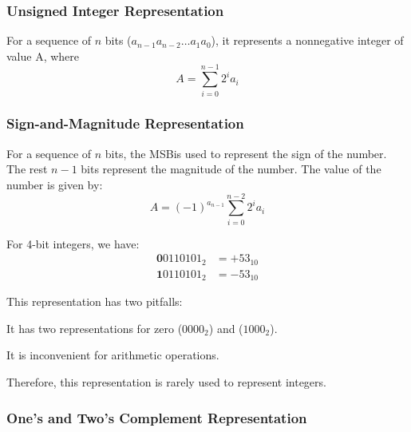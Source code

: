 \subsubsection{Unsigned Integer Representation}

\begin{definition}
    For a sequence of $n$ bits ($a_{n-1}a_{n-2}\ldots a_1a_0$), it represents a nonnegative integer
    of value A, where
    \begin{equation*}
        A = \sum_{i=0}^{n-1} 2^i a_i
    \end{equation*}
\end{definition}

\subsubsection{Sign-and-Magnitude Representation}

\begin{definition}
    For a sequence of $n$ bits, the MSB\footnotemark is used
    to represent the sign of the number. The rest $n-1$ bits represent the magnitude of the number.
    The value of the number is given by:
    \begin{equation*}
        A = (-1)^{a_{n-1}} \sum_{i=0}^{n-2} 2^i a_i
    \end{equation*}

    \begin{example}
    For 4-bit integers, we have:
    \begin{align*}
        \boldsymbol{0}0110101_2 &= \boldsymbol{+}53_{10} \\
        \boldsymbol{1}0110101_2 &= \boldsymbol{-}53_{10}
    \end{align*}
    \end{example}

\end{definition}


This representation has two pitfalls:
\begin{enumerate*}
    \item It has two representations for zero ($0000_2$) and ($1000_2$).
    \item It is inconvenient for arithmetic operations.
\end{enumerate*}
Therefore, this representation is rarely used to represent integers.

\subsubsection{One's and Two's Complement Representation}

